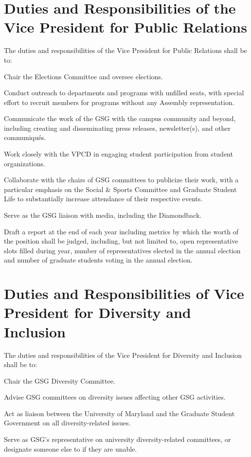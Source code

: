 \section{Duties and Responsibilities of the Vice President for Public Relations}
The duties and responsibilities of the Vice President for Public Relations shall be to:
\begin{bylaws-number}
  \item Chair the Elections Committee and oversee elections.
  \item Conduct outreach to departments and programs with unfilled seats, with special effort to recruit members for programs without any Assembly representation.
  \item Communicate the work of the GSG with the campus community and beyond, including creating and disseminating press releases, newsletter(s), and other communiqués.
  \item Work closely with the VPCD in engaging student participation from student organizations.
  \item Collaborate with the chairs of GSG committees to publicize their work, with a particular emphasis on the Social \& Sports Committee and Graduate Student Life to substantially increase attendance of their respective events.
  \item Serve as the GSG liaison with media, including the Diamondback.
  \item Draft a report at the end of each year including metrics by which the worth of the position shall be judged, including, but not limited to, open representative slots filled during year, number of representatives elected in the annual election and number of graduate students voting in the annual election.
\end{bylaws-number}

\section{Duties and Responsibilities of Vice President for Diversity and Inclusion}
The duties and responsibilities of the Vice President for Diversity and Inclusion shall be to:
\begin{bylaws-number}
	\item Chair the GSG Diversity Committee.
	\item Advise GSG committees on diversity issues affecting other GSG activities.
	\item Act as liaison between the University of Maryland and the Graduate Student Government on all diversity-related issues.
	\item Serve as GSG’s representative on university diversity-related committees, or designate someone else to if they are unable.
\end{bylaws-number}

